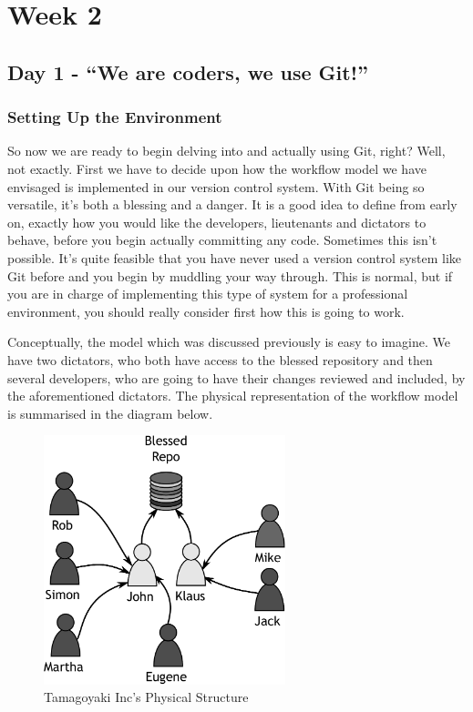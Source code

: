 \chapter{Week 2}
\section{Day 1 - ``We are coders, we use Git!''}
\subsection{Setting Up the Environment}

So now we are ready to begin delving into and actually using Git, right?  Well, not exactly.  First we have to decide upon how the workflow model we have envisaged is implemented in our version control system.  With Git being so versatile, it's both a blessing and a danger.  It is a good idea to define from early on, exactly how you would like the developers, lieutenants and dictators to behave, before you begin actually committing any code.  Sometimes this isn't possible.  It's quite feasible that you have never used a version control system like Git before and you begin by muddling your way through.  This is normal, but if you are in charge of implementing this type of system for a professional environment, you should really consider first how this is going to work. 

Conceptually, the model which was discussed previously is easy to imagine.  We have two dictators, who both have access to the blessed repository and then several developers, who are going to have their changes reviewed and included, by the aforementioned dictators.  The physical representation of the workflow model is summarised in the diagram below.

\begin{figure}[bt]
\centering
\includegraphics[width=7cm]{images/f-w2-d1.pdf}
\caption{Tamagoyaki Inc's Physical Structure}
\end{figure}

